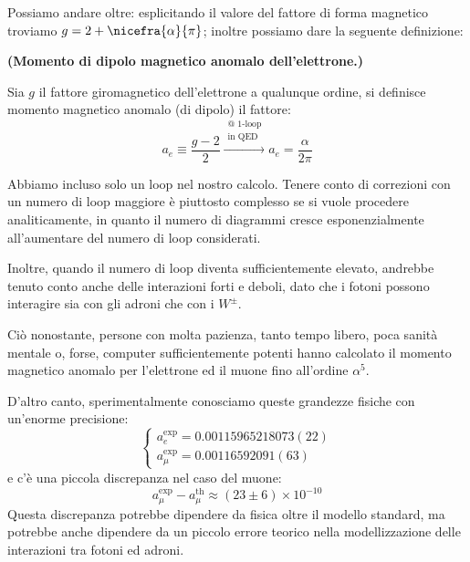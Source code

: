 \documentclass[../main.tex]{subfiles}
\begin{document}
Possiamo andare oltre: esplicitando il valore del fattore di forma magnetico troviamo \(g=2+\nicefra{\alpha}{\pi}\); inoltre possiamo dare la seguente definizione:
\begin{definition}
    \textbf{(Momento di dipolo magnetico anomalo dell'elettrone.)}

    Sia $g$ il fattore giromagnetico dell'elettrone a qualunque ordine, si definisce momento magnetico anomalo (di dipolo) il fattore:
    \begin{equation}
        a_e\equiv\frac{g-2}{2} \xrightarrow[]{\substack{\text{@ 1-loop}\\\text{in QED}}} a_e=\frac{\alpha}{2\pi}
        \label{eq:anomalous_magn_mom}
    \end{equation}
\end{definition}

\begin{nota}
    Abbiamo incluso solo un loop nel nostro calcolo. Tenere conto di correzioni con un numero di loop maggiore è piuttosto complesso se si vuole procedere analiticamente, in quanto il numero di diagrammi cresce esponenzialmente all'aumentare del numero di loop considerati.
    
    Inoltre, quando il numero di loop diventa sufficientemente elevato, andrebbe tenuto conto anche delle interazioni forti e deboli, dato che i fotoni possono interagire sia con gli adroni che con i \(W^\pm\).
    
    Ciò nonostante, persone con molta pazienza, tanto tempo libero, poca sanità mentale o, forse, computer sufficientemente potenti hanno calcolato il momento magnetico anomalo per l'elettrone ed il muone fino all'ordine $\alpha^5$.
    
    D'altro canto, sperimentalmente conosciamo queste grandezze fisiche con un'enorme precisione:
    \[
    \begin{cases}
        a_e^\text{exp} = 0.00115965218073(22)\\
        a_\mu^\text{exp} = 0.00116592091(63)
    \end{cases}
    \]
    e c'è una piccola discrepanza nel caso del muone:
    \[
     a_\mu^\text{exp} -  a_\mu^\text{th} \approx(23\pm6) \times 10^{-10}
    \]
    Questa discrepanza potrebbe dipendere da fisica oltre il modello standard, ma potrebbe anche dipendere da un piccolo errore teorico nella modellizzazione delle interazioni tra fotoni ed adroni.
\end{nota}
\end{document}
